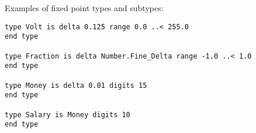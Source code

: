 \example Examples of fixed point types and subtypes:
\begin{lstlisting}
type Volt is delta 0.125 range 0.0 ..< 255.0 
end type

type Fraction is delta Number.Fine_Delta range -1.0 ..< 1.0 
end type

type Money is delta 0.01 digits 15 
end type

type Salary is Money digits 10 
end type
\end{lstlisting}





